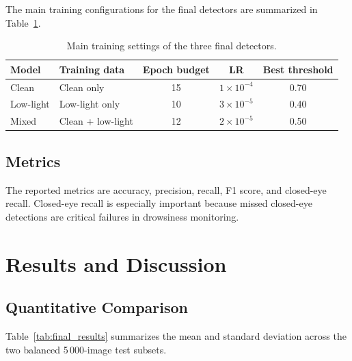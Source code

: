 \documentclass[conference]{IEEEtran}
\begin{document}
The main training configurations for the final detectors are summarized in Table~\ref{tab:model_configs}.

\begin{table}[!t]
\caption{Main training settings of the three final detectors.}
\label{tab:model_configs}
\centering
\footnotesize
\setlength{\tabcolsep}{5pt}
\begin{tabular}{>{\raggedright\arraybackslash}p{1.35cm}>{\raggedright\arraybackslash}p{1.55cm}ccc}
\toprule
Model & Training data & Epoch budget & LR & Best threshold \\
\midrule
Clean & Clean only & 15 & $1 \times 10^{-4}$ & 0.70 \\
Low-light & Low-light only & 10 & $3 \times 10^{-5}$ & 0.40 \\
Mixed & Clean + low-light & 12 & $2 \times 10^{-5}$ & 0.50 \\
\bottomrule
\end{tabular}
\end{table}

\subsection{Metrics}

The reported metrics are accuracy, precision, recall, F1 score, and closed-eye recall. Closed-eye recall is especially important because missed closed-eye detections are critical failures in drowsiness monitoring.

\section{Results and Discussion}

\subsection{Quantitative Comparison}

Table~\ref{tab:final_results} summarizes the mean and standard deviation across the two balanced 5\,000-image test subsets.

\begin{table}[!t]
\caption{Compact final comparison across two held-out balanced 5\,000-image subsets.}
\label{tab:final_results}
\centering
\footnotesize
\setlength{\tabcolsep}{3.2pt}
\end{table}
\end{document}
